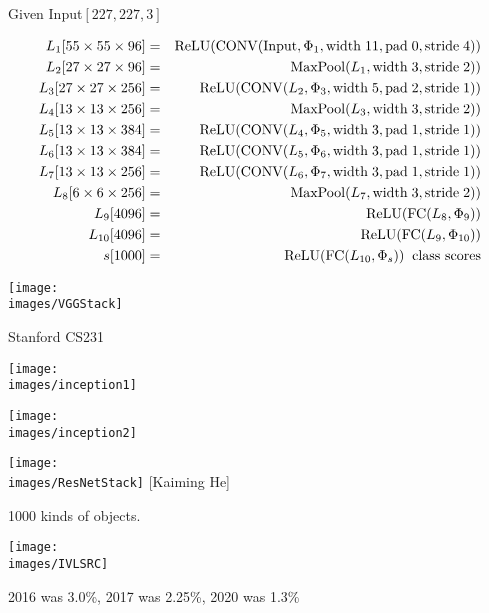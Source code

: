 {
{\huge
\centerline{Given Input$[227,227,3]$}

\begin{eqnarray*}
L_1[55 \times 55 \times 96] & = & \mathrm{ReLU}(\mathrm{CONV}(\mathrm{Input},\Phi_1,\mathrm{width}\;11,\mathrm{pad}\;0,\mathrm{stride}\;4)) \\
L_2[27 \times 27 \times 96] & = & \mathrm{MaxPool}(L_1,\mathrm{width}\;3,\mathrm{stride}\;2))  \\
L_3[27 \times 27 \times 256] & = & \mathrm{ReLU}(\mathrm{CONV}(L_2,\Phi_3,\mathrm{width}\;5,\mathrm{pad}\;2,\mathrm{stride}\;1))  \\
L_4[13 \times 13 \times 256] & = & \mathrm{MaxPool}(L_3,\mathrm{width}\;3,\mathrm{stride}\;2))  \\
L_5[13 \times 13 \times 384] & = & \mathrm{ReLU}(\mathrm{CONV}(L_4,\Phi_5,\mathrm{width}\;3,\mathrm{pad}\;1,\mathrm{stride}\;1))  \\
L_6[13 \times 13 \times 384] & = & \mathrm{ReLU}(\mathrm{CONV}(L_5,\Phi_6,\mathrm{width}\;3,\mathrm{pad}\;1,\mathrm{stride}\;1))  \\
L_7[13 \times 13 \times 256] & = & \mathrm{ReLU}(\mathrm{CONV}(L_6,\Phi_7,\mathrm{width}\;3,\mathrm{pad}\;1,\mathrm{stride}\;1))  \\
L_8[6 \times 6 \times 256] & = & \mathrm{MaxPool}(L_7,\mathrm{width}\;3,\mathrm{stride}\;2)) \\
L_9[4096] & = & \mathrm{ReLU}(\mathrm{FC}(L_8,\Phi_9)) \\
L_{10}[4096] & = & \mathrm{ReLU}(\mathrm{FC}(L_9,\Phi_{10})) \\
s[1000] & = & \mathrm{ReLU}(\mathrm{FC}(L_{10},\Phi_s)) \;\;\mbox{class scores}
\end{eqnarray*}
}

\centerline{\texttt{[image: \\images/VGGStack]}}
\centerline{\large Stanford CS231}


\centerline{\texttt{[image: \\images/inception1]}}
\vfill
\centerline{\texttt{[image: \\images/inception2]}}

\centerline{\texttt{[image: \\images/ResNetStack]} {\large [Kaiming He]}}


1000 kinds of objects.

\vfill
\centerline{\texttt{[image: \\images/IVLSRC]}}
2016 was 3.0\%, 2017 was  2.25\%, 2020 was 1.3\%
 
}

